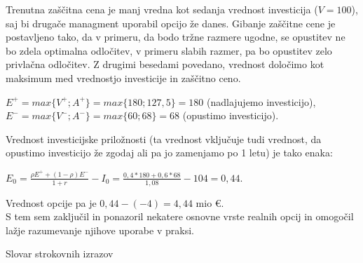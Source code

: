 \documentclass[12pt, a4paper]{amsart}
\theoremstyle{definition} %
\theoremstyle{plain} %
\begin{document}
Trenutna zaščitna cena je manj vredna kot sedanja vrednost investicija ($V = 100$), saj bi drugače managment uporabil opcijo že danes. Gibanje zaščitne cene je postavljeno tako, da v primeru, da bodo tržne razmere ugodne, se opustitev ne bo zdela optimalna odločitev, v primeru slabih razmer, pa bo opustitev zelo privlačna odločitev. Z drugimi besedami povedano, vrednost določimo kot maksimum med vrednostjo investicije in zaščitno ceno.
\begin{center}
$E^+ = max\{V^+; A^+\}= max\{180; 127,5\} = 180$ (nadlajujemo investicijo), \\[0,5 cm]
$E^- = max\{V^-; A^-\}= max\{60; 68\} = 68$ (opustimo investicijo). \\[0,5 cm]
\end{center}

Vrednost investicijske priložnosti (ta vrednost vključuje tudi vrednost, da opustimo investicijo že zgodaj ali pa jo zamenjamo po 1 letu) je tako enaka: \\[0,5 cm]
\begin{center}
$E_0 = \tfrac{\rho E^+ + (1-\rho)E^-}{1+r}-I_0 = \tfrac{0,4*180+0,6*68}{1,08} -104 = 0,44$. 
\end{center}

Vrednost opcije pa je $0,44-(-4)=4,44$ mio €. \\

S tem sem zaključil in ponazoril nekatere osnovne vrste realnih opcij in omogočil lažje razumevanje njihove uporabe v praksi.


\pagebreak
\begin{center}
\large{Slovar strokovnih izrazov}
\end{center}
\end{document}
